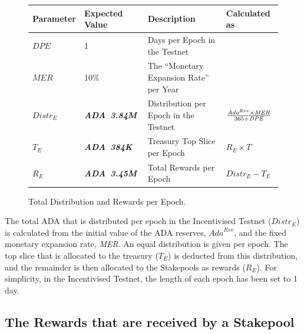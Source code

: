 \documentclass[11pt,a4paper,dvipsnames,twosided,final]{article}
\newcommand{\ada}{ADA{}}
\newcommand{\ADA}[1]{\textbf{\emph{\ada~{#1}}}}
\begin{document}
\begin{figure}[h!]
\begin{center}
\begin{tabular}{||l|l|p{6cm}|l||}
  \hline \hline
\textbf{Parameter} & \textbf{Expected Value} & \textbf{Description} & \textbf{Calculated as} \\\hline
$\textit{DPE}$ & 1 & Days per Epoch in the Testnet & \\\hline
$\textit{MER}$ & 10\% &  The ``Monetary Expansion Rate'' per Year & \\\hline
$\textit{Distr}_E$ & \ADA{3.84M} & Distribution per Epoch in the Testnet & $\frac{\large \textit{Ada}^{Rsv} \times \textit{MER}}{\large 365 \div \textit{DPE}}$ \\\hline
$T_E$ & \ADA{384K} & Treasury Top Slice per Epoch & $R_E \times T$ \\\hline
$R_E$ & \ADA{3.45M} & Total Rewards per Epoch & $\textit{Distr}_E - T_E$ \\\hline
  \hline
\end{tabular}
\end{center}
\caption{Total Distribution and Rewards per Epoch.}
\label{fig:distrib}
\end{figure}

\noindent
The total \ada{} that is distributed per epoch in the Incentivised Testnet (${Distr}_E$) is calculated from the initial
value of the \ada{} reserves, $\textit{Ada}^{Rsv}$, and the fixed monetary expansion rate, \textit{MER}.
An equal distribution is given per epoch.  The top slice that is allocated to the treasury ($T_E$) is
deducted from this distribution, and the remainder is then allocated to the Stakepools as rewards ($R_E$).
For simplicity, in the Incentivised Testnet, the length of each epoch has been set to 1 day.

\clearpage
\subsection{The Rewards that are received by a Stakepool}
\end{document}
